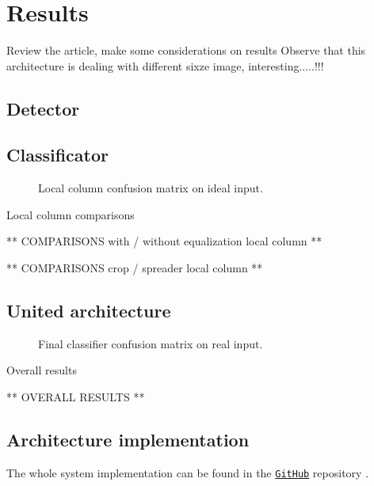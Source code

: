 \section{Results}\label{section:results}
    Review the article, make some considerations on results
    Observe that this architecture is dealing with different sixze image, interesting.....!!!

    \subsection{Detector}
    \subsection{Classificator}
    \par{

    }
    \begin{figure}
        \centering
        \caption{Local column confusion matrix on ideal input.}\label{fig:local-confusion}
    \end{figure}
    \begin{table}
        \caption{Local column comparisons}\label{table:results:local-comparisons}
    \end{table}
    \par{
        ** COMPARISONS with / without equalization local column **
    }
    \par{
        ** COMPARISONS crop / spreader local column **
    }
    \subsection{United architecture}
    \begin{figure}
        \centering
        
        \caption{Final classifier confusion matrix on real input.}\label{fig:results:final-classifier}
    \end{figure}
    \begin{table}
        \caption{Overall results}\label{table:results}
    \end{table}
    \par{
        ** OVERALL RESULTS **
    }
    \subsection{Architecture implementation}
    \par{
        The whole system implementation can be found in the \href{https://github.com/antonioterpin/wavelet_ml}{\texttt{GitHub}} repository \cite{antonioterpin:github}.
    }

